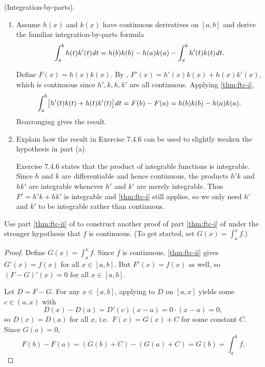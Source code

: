 \begin{problem}
  \label{prob:integration-by-parts}
  (Integration-by-parts).
  \begin{enumerate}[label=(\alph*)]
    \item Assume $h(x)$ and $k(x)$ have continuous derivatives on $[a, b]$ and derive
      the familiar integration-by-parts formula
      \[
        \int_{a}^{b} h(t)k'(t) \mathit{d} t = h(b)k(b) - h(a)k(a) - \int_{a}^{b} h'(t)k(t) \mathit{d} t.
      \]

      Define $F(x) = h(x)k(x)$. By ,
      $F'(x) = h'(x)k(x) + h(x)k'(x)$, which is continuous since $h', k, h, k'$ are all
      continuous. Applying \ref{thm:ftc-i},
      \[
        \int_{a}^{b} \bigl[h'(t)k(t) + h(t)k'(t)\bigr] \mathit{d} t = F(b) - F(a) = h(b)k(b) - h(a)k(a).
      \]
      Rearranging gives the result.

    \item Explain how the result in Exercise 7.4.6 can be used to slightly weaken the
      hypothesis in part (a).

      Exercise 7.4.6 states that the product of integrable functions is integrable. Since
      $h$ and $k$ are differentiable and hence continuous, the products $h'k$ and $hk'$ are
      integrable whenever $h'$ and $k'$ are merely integrable. Thus $F' = h'k + hk'$ is
      integrable and \ref{thm:ftc-i} still applies, so we only need $h'$
      and $k'$ to be integrable rather than continuous.
  \end{enumerate}
\end{problem}

\begin{problem}
  Use part \ref{thm:ftc-ii} of  to construct another proof of
  part \ref{thm:ftc-i} of  under the stronger hypothesis that $f$
  is continuous. (To get started, set $G(x) = \int_{a}^{x} f$.)
  \begin{proof}
    Define $G(x) = \int_{a}^{x} f$. Since $f$ is continuous,
    \ref{thm:ftc-ii} gives $G'(x) = f(x)$ for all $x \in [a, b]$.
    But $F'(x) = f(x)$ as well, so $(F - G)'(x) = 0$ for all $x \in [a, b]$.

    Let $D = F - G$. For any $x \in [a, b]$, applying
     to $D$ on $[a, x]$ yields some $c \in (a, x)$
    with
    \[
      D(x) - D(a) = D'(c)(x - a) = 0 \cdot (x - a) = 0,
    \]
    so $D(x) = D(a)$ for all $x$, i.e.\ $F(x) = G(x) + C$ for some constant $C$.
    Since $G(a) = 0$,
    \[
      F(b) - F(a) = (G(b) + C) - (G(a) + C) = G(b) = \int_{a}^{b} f.
    \]
  \end{proof}
\end{problem}

